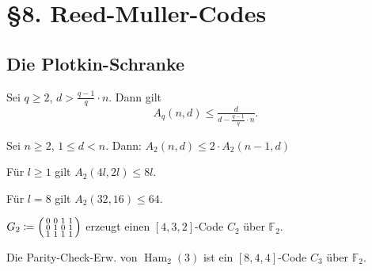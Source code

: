\documentclass{cheat-sheet}
\newcommand{\F}{\mathbb{F}} %
\newcommand{\lin}{\text{lin}} %
\DeclareMathOperator{\Ham}{Ham} %
\begin{document}

\section{§8. Reed-Muller-Codes}


\subsection{Die Plotkin-Schranke}

\begin{satz}
  Sei $q \geq 2$, $d > \tfrac{q-1}{q} \cdot n$.
  Dann gilt
  \[ A_q(n, d) \leq \tfrac{d}{d - \tfrac{q-1}{q} \cdot n}. \]
\end{satz}

\begin{lem}
  Sei $n \geq 2$, $1 \leq d < n$.
  Dann: $A_2(n, d) \leq 2 \cdot A_2(n-1, d)$
\end{lem}

\begin{satz}
  Für $l \geq 1$ gilt $A_2(4 l, 2 l) \leq 8 l$.
\end{satz}

\iffalse
\begin{bsp}
  Für $l=8$ gilt $A_2(32, 16) \leq 64$.
\end{bsp}

\begin{bsp}
  $G_2 \coloneqq \begin{psmallmatrix}
    0 & 0 & 1 & 1 \\
    0 & 1 & 0 & 1 \\
    1 & 1 & 1 & 1
  \end{psmallmatrix}$
  erzeugt einen $[4, 3, 2]$-Code $C_2$ über $\F_2$.
\end{bsp}

\begin{bsp}
  Die Parity-Check-Erw. von $\Ham_2(3)$ ist ein $[8, 4, 4]$-Code $C_3$ über $\F_2$.
\end{bsp}
\end{document}
